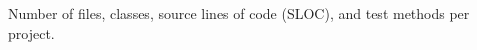 \begin{table}
  \caption{Number of files, classes, source lines of code (SLOC), and test methods per project.}
  \label{tab:dataset-statistics}
  
\end{table}